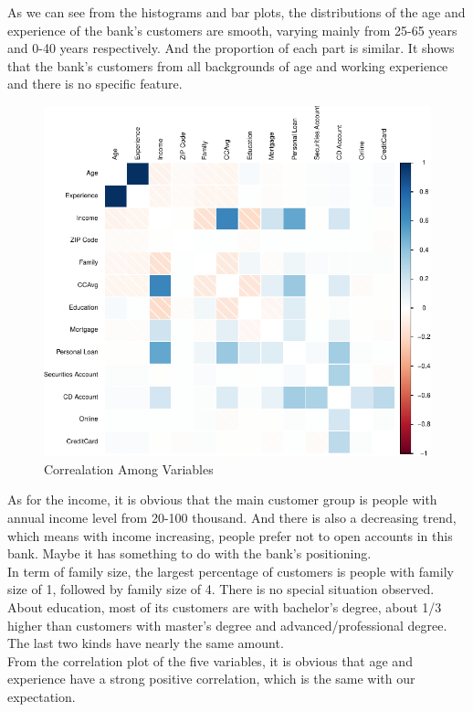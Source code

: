 \documentclass[]{article}
\begin{document}
  As we can see from the histograms and bar plots, the distributions of the age and experience of the bank’s customers are smooth, varying mainly from 25-65 years and 0-40 years respectively. And the proportion of each part is similar. It shows that the bank’s customers from all backgrounds of age and working experience and there is no specific feature.\\ 
\begin{figure} 
  \includegraphics{tem_files/figure-latex/exa-1.pdf}
  \caption{Correalation Among Variables}
\end{figure}
  As for the income, it is obvious that the main customer group is people with annual income level from 20-100 thousand. And there is also a decreasing trend, which means with income increasing, people prefer not to open accounts in this bank. Maybe it has something to do with the bank’s positioning.\\
  In term of family size, the largest percentage of customers is people with family size of 1, followed by family size of 4. There is no special situation observed.\\
  About education, most of its customers are with bachelor’s degree, about 1/3 higher than customers with master’s degree and advanced/professional degree. The last two kinds have nearly the same amount.\\
  From the correlation plot of the five variables, it is obvious that age and experience have a strong positive correlation, which is the same with our expectation. \\
\end{document}
